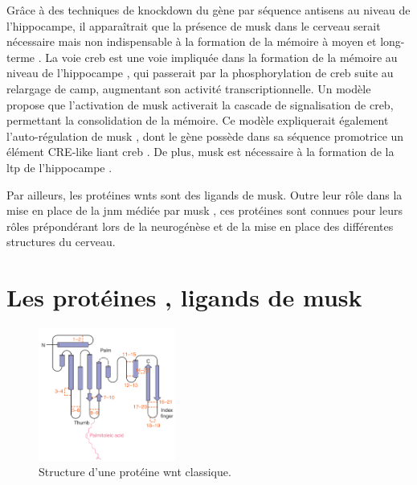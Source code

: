 	Grâce à des techniques de knockdown du gène par séquence antisens au niveau de l'hippocampe, il apparaîtrait que la présence de \gls{musk} dans le cerveau serait nécessaire mais non indispensable à la formation de la mémoire à moyen et long-terme \cite{Garcia-Osta2006}. La voie \gls{creb} est une voie impliquée dans la formation de la mémoire au niveau de l'hippocampe \cite{Silva1998, Kandel2012,Kida2014,Ortega-Martinez2015}, qui passerait par la phosphorylation de \gls{creb} suite au relargage de \acrshort{camp}, augmentant son activité transcriptionnelle. Un modèle propose \cite{Garcia-Osta2006} que l'activation de \gls{musk} activerait la cascade de signalisation de \gls{creb}, permettant la consolidation de la mémoire. Ce modèle expliquerait également l'auto-régulation de \gls{musk} \cite{Moore2001}, dont le gène possède dans sa séquence promotrice un élément CRE-like liant \gls{creb} \cite{Kim2005}. De plus, \gls{musk} est nécessaire à la formation de la \gls{ltp} de l'hippocampe \cite{Garcia-Osta2006}.

	Par ailleurs, les protéines \glspl{wnt} sont des ligands de \gls{musk}. Outre leur rôle dans la mise en place de la \gls{jnm} médiée par \gls{musk} \cite{Hall2000}, ces protéines sont connues pour leurs rôles prépondérant lors de la neurogénèse et de la mise en place des différentes structures du cerveau.
	

\section{Les protéines , ligands de \acrshort{musk}}
\label{sec:IntroWnt}	
	\begin{figure}
		\includegraphics[width=0.4\textwidth]{./Images/WntProtein.png}	
		\caption{Structure d'une protéine \Gls{wnt} classique.}
		\label{fig:WntProt}
	\end{figure}
	
